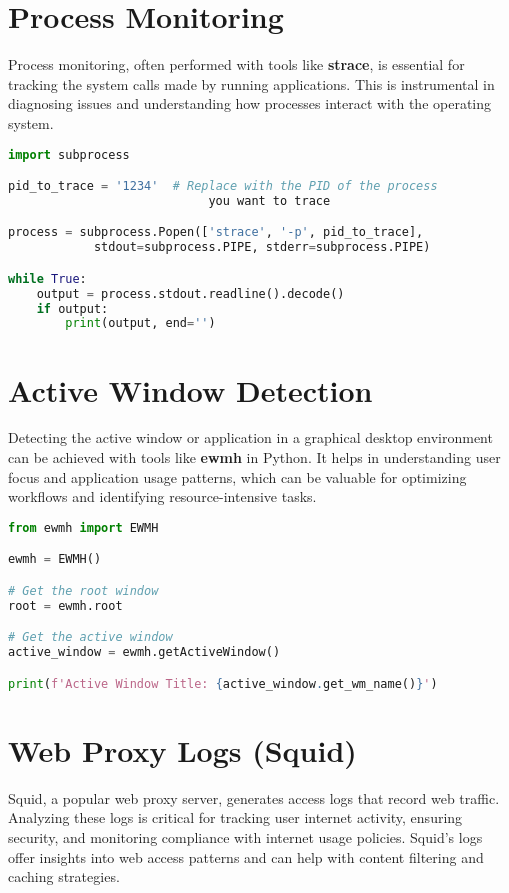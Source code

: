 \documentclass{VUMIFPSmagistrinis}
\begin{document}
\section{Process Monitoring}
Process monitoring, often performed with tools like \textbf{strace}, is essential for tracking the system calls made by running applications. This is instrumental in diagnosing issues and understanding how processes interact with the operating system.


\begin{lstlisting}[language=Python]
import subprocess

pid_to_trace = '1234'  # Replace with the PID of the process 
                            you want to trace

process = subprocess.Popen(['strace', '-p', pid_to_trace], 
            stdout=subprocess.PIPE, stderr=subprocess.PIPE)

while True:
    output = process.stdout.readline().decode()
    if output:
        print(output, end='')
\end{lstlisting}

\section{Active Window Detection}
Detecting the active window or application in a graphical desktop environment can be achieved with tools like \textbf{ewmh} in Python. It helps in understanding user focus and application usage patterns, which can be valuable for optimizing workflows and identifying resource-intensive tasks.

\begin{lstlisting}[language=Python]
from ewmh import EWMH

ewmh = EWMH()

# Get the root window
root = ewmh.root

# Get the active window
active_window = ewmh.getActiveWindow()

print(f'Active Window Title: {active_window.get_wm_name()}')
\end{lstlisting}

\section{Web Proxy Logs (Squid)}
Squid, a popular web proxy server, generates access logs that record web traffic. Analyzing these logs is critical for tracking user internet activity, ensuring security, and monitoring compliance with internet usage policies. Squid's logs offer insights into web access patterns and can help with content filtering and caching strategies.
\end{document}

